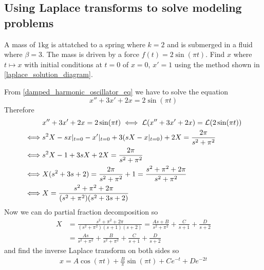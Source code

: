 \documentclass[notes]{subfiles}
\begin{document}
\subsection{Using Laplace transforms to solve modeling problems}
\begin{exercise}
    A mass of $1\si{\kg}$ is attatched to a spring where $k = 2$ and is submerged in a fluid where $\beta = 3$. The mass is driven by a force $f(t) = 2\sin(\pi t)$. Find $x$ where $t \mapsto x$ with initial conditions at $t = 0$ of $x = 0$, $x' = 1$ using the method 
    shown in \cref{laplace_solution_diagram}.
\end{exercise}
\begin{solution}
    From \cref{damped_harmonic_oscillator_eq} we have to solve the equation
    \[
        x'' + 3x' + 2x = 2\sin(\pi t)
    \]
    Therefore
    \begin{align*}
        &x'' + 3x' + 2x = 2\sin(\pi t)
        \iff \mathcal{L} (x'' + 3x' + 2x) = \mathcal{L} (2\sin(\pi t)) \\
        \iff& s^2 X - sx|_{t = 0} - x'|_{t = 0} + 3(sX - x|_{t = 0}) + 2X = \frac{2\pi}{s^2 + \pi^2} \\
        \iff& s^2X - 1 + 3sX + 2X = \frac{2\pi}{s^2 + \pi^2} \\
        \iff& X(s^2 + 3s + 2) = \frac{2\pi}{s^2 + \pi^2} + 1 = \frac{s^2 + \pi^2 + 2\pi}{s^2 + \pi^2} \\
        \iff& X = \frac{s^2 + \pi^2 + 2\pi}{(s^2 + \pi^2)(s^2 + 3s + 2)}
    \end{align*}
    Now we can do partial fraction decomposition so
    \begin{align*}
        X
        &= \frac{s^2 + \pi^2 + 2\pi}{(s^2 + \pi^2)(s + 1)(s + 2)}
        = \frac{As + B}{s^2 + \pi^2} + \frac{C}{s + 1} + \frac{D}{s + 2} \\
        &= \frac{As}{s^2 + \pi^2} + \frac{B}{s^2 + \pi^2} + \frac{C}{s + 1} + \frac{D}{s + 2}
    \end{align*}
    and find the inverse Laplace transform on both sides so
    \begin{align*}
        x = A\cos(\pi t) + \frac{B}{\pi}\sin(\pi t) + Ce^{-t} + De^{-2t}
    \end{align*}
\end{solution}
\end{document}
